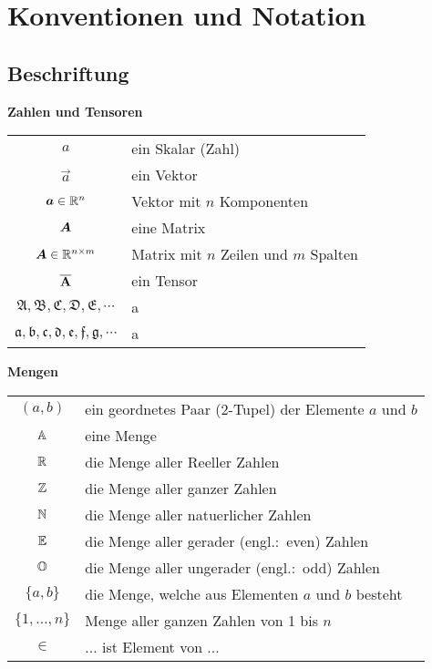 \documentclass[../main]{subfiles}
\begin{document}
\section{Konventionen und Notation}

\subsection*{Beschriftung}

\begin{center}\textbf{Zahlen und Tensoren}\end{center}
\begin{tabular}{cl}
  $a$ & ein Skalar (Zahl) \\
  $\vec{a}$ & ein Vektor \\
  $\bm{a} \in \mathbb{R}^{n}$ & Vektor mit $n$ Komponenten \\
  $\bm{A}$ & eine Matrix \\
  $\bm{A} \in \mathbb{R}^{n \times m}$ & Matrix mit $n$ Zeilen und $m$ Spalten \\
  $\overline{\mathbf{A}}$ & ein Tensor \\
  $\mathfrak{A,B,C,D,E,\cdots}$ & a \\
  $\mathfrak{a,b,c,d,e,f,g,\cdots}$ & a \\


\end{tabular}

\begin{center}\textbf{Mengen}\end{center}
\begin{tabular}{cl}
  $(a,b)$ & ein geordnetes Paar (2-Tupel) der Elemente $a$ und $b$ \\
  $\mathbb{A}$ & eine Menge \\
  $\mathbb{R}$ & die Menge aller Reeller Zahlen \\
  $\mathbb{Z}$ & die Menge aller ganzer Zahlen \\
  $\mathbb{N}$ & die Menge aller natuerlicher Zahlen \\
  $\mathbb{E}$ & die Menge aller gerader (engl.:\ even) Zahlen \\
  $\mathbb{O}$ & die Menge aller ungerader (engl.:\ odd) Zahlen \\
  $\{a,b\}$ & die Menge, welche aus Elementen $a$ und $b$ besteht \\
  $\{1,\ldots,n\}$ & Menge aller ganzen Zahlen von 1 bis $n$ \\
  $\in$ & ... ist Element von ...

\end{tabular}
\end{document}

